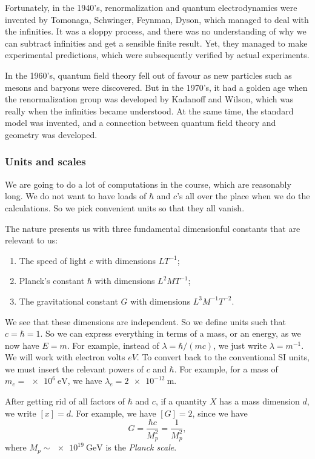 \documentclass[a4paper]{article}
\begin{document}
Fortunately, in the 1940's, renormalization and quantum electrodynamics were invented by Tomonaga, Schwinger, Feynman, Dyson, which managed to deal with the infinities. It was a sloppy process, and there was no understanding of why we can subtract infinities and get a sensible finite result. Yet, they managed to make experimental predictions, which were subsequently verified by actual experiments.

In the 1960's, quantum field theory fell out of favour as new particles such as mesons and baryons were discovered. But in the 1970's, it had a golden age when the renormalization group was developed by Kadanoff and Wilson, which was really when the infinities became understood. At the same time, the standard model was invented, and a connection between quantum field theory and geometry was developed.

\subsubsection*{Units and scales}
We are going to do a lot of computations in the course, which are reasonably long. We do not want to have loads of $\hbar$ and $c$'s all over the place when we do the calculations. So we pick convenient units so that they all vanish.

The nature presents us with three fundamental dimensionful constants that are relevant to us:
\begin{enumerate}
  \item The speed of light $c$ with dimensions $LT^{-1}$;
  \item Planck's constant $\hbar$ with dimensions $L^2 MT^{-1}$;
  \item The gravitational constant $G$ with dimensions $L^3 M^{-1} T^{-2}$.
\end{enumerate}
We see that these dimensions are independent. So we define units such that $c = \hbar = 1$. So we can express everything in terms of a mass, or an energy, as we now have $E = m$. For example, instead of $\lambda = \hbar/(mc)$, we just write $\lambda = m^{-1}$. We will work with electron volts $eV$. To convert back to the conventional SI units, we must insert the relevant powers of $c$ and $\hbar$. For example, for a mass of $m_e = \SI{e6}\electronvolt$, we have $\lambda_e = \SI{2e-12}{\meter}$.

After getting rid of all factors of $\hbar$ and $c$, if a quantity $X$ has a mass dimension $d$, we write $[x] = d$. For example, we have $[G] = 2$, since we have
\[
  G = \frac{\hbar c}{M_p^2} = \frac{1}{M_p^2},
\]
where $M_p \sim \SI{e19}{\giga\electronvolt}$ is the \emph{Planck scale}.
\end{document}
